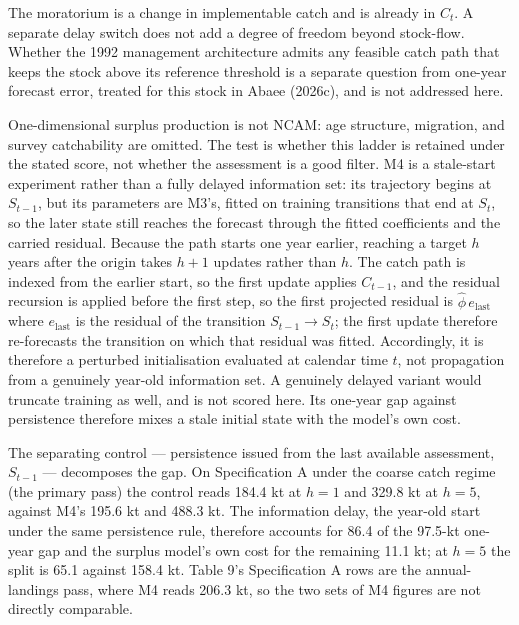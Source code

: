 \documentclass[11pt]{article}
\begin{document}
The moratorium is a change in implementable catch and is already in
\(C_t\). A separate delay switch does not add a degree of freedom beyond
stock-flow. Whether the 1992 management architecture admits any feasible
catch path that keeps the stock above its reference threshold is a
separate question from one-year forecast error, treated for this stock
in Abaee (2026c), and is not addressed
here.

One-dimensional surplus production is not NCAM: age structure,
migration, and survey catchability are omitted. The test is whether this
ladder is retained under the stated score, not whether the assessment is
a good filter. M4 is a stale-start experiment rather than a fully delayed information
set: its trajectory begins at \(S_{t-1}\), but its parameters are
M3's, fitted on training transitions that end at \(S_t\), so the
later state still reaches the forecast through the fitted coefficients
and the carried residual. Because the path starts one year earlier,
reaching a target \(h\) years after the origin takes \(h+1\) updates
rather than \(h\). The catch path is indexed from the earlier start, so
the first update applies \(C_{t-1}\), and the residual recursion is
applied before the first step, so the first projected residual is
\(\hat\phi\,e_{\mathrm{last}}\) where \(e_{\mathrm{last}}\) is the
residual of the transition \(S_{t-1}\to S_t\); the first update
therefore re-forecasts the transition on which that residual was fitted.
Accordingly, it is therefore a perturbed
initialisation evaluated at calendar time \(t\), not propagation from a
genuinely year-old information set. A genuinely delayed variant would truncate
training as well, and is not scored here. Its one-year gap against
persistence therefore mixes a stale initial state with the model's own
cost.

The separating control --- persistence issued from the last available
assessment, \(S_{t-1}\) --- decomposes the gap. On Specification A under
the coarse catch regime (the primary pass) the control reads 184.4 kt at
\(h = 1\) and 329.8 kt at \(h = 5\), against M4's 195.6 kt and 488.3 kt.
The information delay, the year-old start under the same persistence
rule, therefore accounts for 86.4 of the 97.5-kt one-year gap and the
surplus model's own cost for the remaining 11.1 kt; at \(h = 5\) the
split is 65.1 against 158.4 kt. Table 9's Specification A rows are the
annual-landings pass, where M4 reads 206.3 kt, so the two sets of M4
figures are not directly comparable.
\end{document}
